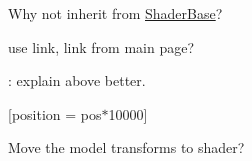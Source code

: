 
\begin{DoxyRefList}
\item[\label{todo__todo000005}%
\hypertarget{todo__todo000005}{}%
\-Class \hyperlink{classQuad}{\-Quad} ]\-Why not inherit from \hyperlink{classShaderBase}{\-Shader\-Base}?  
\item[\label{todo__todo000001}%
\hypertarget{todo__todo000001}{}%
\-Class \hyperlink{classShaderBase}{\-Shader\-Base} ]use link, link from main page?  
\item[\label{todo__todo000004}%
\hypertarget{todo__todo000004}{}%
\-Class \hyperlink{classSkyBox}{\-Sky\-Box} ]\-: explain above better. 
\item[\label{todo__todo000002}%
\hypertarget{todo__todo000002}{}%
\-File \hyperlink{skybox_8cpp}{skybox.cpp} ]\mbox{[}position = pos$\ast$10000\mbox{]}  
\item[\label{todo__todo000003}%
\hypertarget{todo__todo000003}{}%
\-Member \hyperlink{classSkyBox_ab9db46f2e34683cae517ba97a44aee9e}{\-Sky\-Box\-:\-:\-Draw} ()]\-Move the model transforms to shader? 
\end{DoxyRefList}